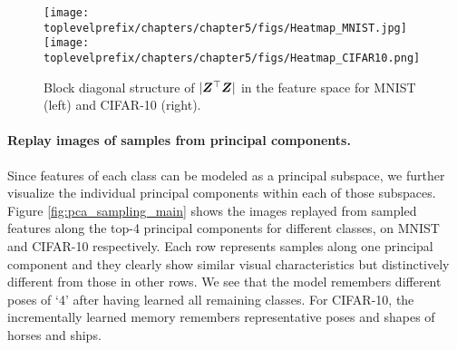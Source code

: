 \documentclass[\toplevelprefix/book-main.tex]{subfiles}
\begin{document}
\begin{figure}[tb]
\centering
\texttt{[image: \\toplevelprefix/chapters/chapter5/figs/Heatmap\_MNIST.jpg]}  
\texttt{[image: \\toplevelprefix/chapters/chapter5/figs/Heatmap\_CIFAR10.png]}
\caption{\small Block diagonal structure of $|\bm{Z}^\top \bm{Z}|$ in the feature space for MNIST (left) and CIFAR-10 (right).}
\label{fig:cifar_10_pca_sampling_main}
\end{figure}



\paragraph{Replay images of samples from principal components.}
Since features of each class can be modeled as a principal subspace, we further visualize the individual principal components within each of those subspaces. Figure \ref{fig:pca_sampling_main} shows the images replayed from sampled features along the top-4 principal components for different classes, on MNIST and CIFAR-10 respectively. Each row represents samples along one principal component and they clearly show similar visual characteristics but distinctively different from those in other rows. We see that the model remembers different poses of `4' after having learned all remaining classes. For CIFAR-10, the incrementally learned memory remembers representative poses and shapes of horses and ships. 
\end{document}
